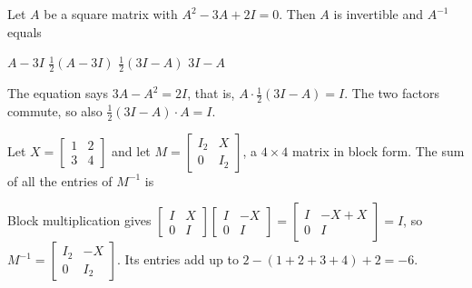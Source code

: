 \begin{question}[id=mat-14, marks=2]
Let $A$ be a square matrix with $A^2 - 3A + 2I = 0$. Then $A$ is invertible and $A^{-1}$ equals
\begin{options}
  \option $A - 3I$
  \option $\tfrac{1}{2}(A - 3I)$
  \correct $\tfrac{1}{2}(3I - A)$
  \option $3I - A$
\end{options}
\begin{solution}
The equation says $3A - A^2 = 2I$, that is, $A \cdot \tfrac{1}{2}(3I - A) = I$. The two factors commute, so also $\tfrac{1}{2}(3I - A) \cdot A = I$.
\end{solution}
\end{question}

\begin{question}[id=mat-15, marks=2]
Let $X = \begin{bmatrix} 1 & 2 \\ 3 & 4 \end{bmatrix}$ and let $M = \begin{bmatrix} I_2 & X \\ 0 & I_2 \end{bmatrix}$, a $4 \times 4$ matrix in block form. The sum of all the entries of $M^{-1}$ is
\begin{solution}
Block multiplication gives $\begin{bmatrix} I & X \\ 0 & I \end{bmatrix} \begin{bmatrix} I & -X \\ 0 & I \end{bmatrix} = \begin{bmatrix} I & -X + X \\ 0 & I \end{bmatrix} = I$, so $M^{-1} = \begin{bmatrix} I_2 & -X \\ 0 & I_2 \end{bmatrix}$. Its entries add up to $2 - (1 + 2 + 3 + 4) + 2 = -6$.
\end{solution}
\end{question}

